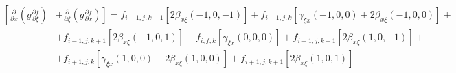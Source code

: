 \begin{equation*}
    \begin{split}
        \left[
            \frac
                {\partial}
                {\partial x}
            \left(
                g
                \frac
                    {\partial f}
                    {\partial \xi}
            \right)
        \right.
            &
        \left.
            +
            \frac
                {\partial}
                {\partial \xi}
            \left(
                g
                \frac
                    {\partial f}
                    {\partial x}
            \right)
        \right]
        =
        f_{i-1, j, k-1}
        \left[
            2
            \beta_{x\xi} \left(-1, 0, -1\right)
        \right]
        +
        f_{i-1, j, k}
        \left[
            \gamma_{\xi x} \left(-1, 0, 0\right)
            +
            2
            \beta_{x \xi} \left(-1, 0, 0\right)
        \right]
        +
        \\
        &
        +
        f_{i-1, j, k+1}
        \left[
            2
            \beta_{x\xi} \left(-1, 0, 1\right)
        \right]
        +
        f_{i, f, k}
        \left[
            \gamma_{\xi x} \left(0, 0, 0\right)
        \right]
        +
        f_{i+1, j, k-1}
        \left[
            2
            \beta_{x\xi} \left(1, 0, -1\right)
        \right]
        +
        \\
        &
        +
        f_{i+1, j, k}
        \left[
            \gamma_{\xi x} \left(1, 0, 0\right)
            +
            2
            \beta_{x \xi} \left(1, 0, 0\right)
        \right]
        +
        f_{i+1, j, k+1}
        \left[
            2
            \beta_{x\xi} \left(1, 0, 1\right)
        \right]
    \end{split}
\end{equation*}

